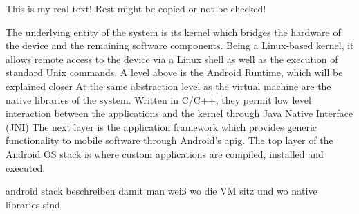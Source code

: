 This is my real text! Rest might be copied or not be checked!

%
The underlying entity of the system is its kernel which bridges the hardware of the device and the remaining software components. Being a Linux-based kernel, it allows remote access to the device via a Linux shell as well as the execution of standard Unix commands.\newline
A level above is the Android Runtime, which will be explained closer\newline
At the same abstraction level as the virtual machine are the native libraries of the system. Written in C/C++, they permit low level interaction between the applications and the kernel through Java Native Interface (JNI)\newline
The next layer is the application framework which provides generic functionality to mobile software through Android’s  \gls{apig}.
The top layer of the Android OS stack is where custom applications are compiled, installed and executed.\newline
\cite{kovachevaMaster}
%


android stack beschreiben damit man weiß wo die VM sitz und wo native libraries sind
